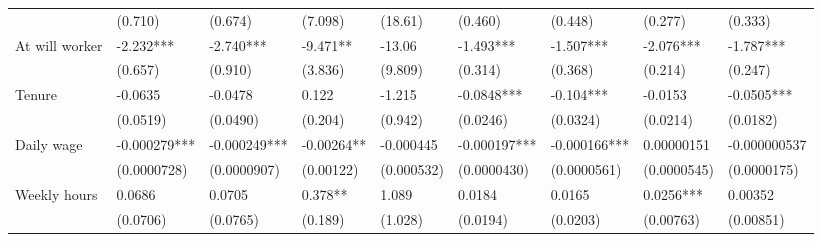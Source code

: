 \begin{tabular}{lrrrrrrrr}
      & \multicolumn{1}{l}{(0.710)} & \multicolumn{1}{l}{(0.674)} & \multicolumn{1}{l}{(7.098)} & \multicolumn{1}{l}{(18.61)} & \multicolumn{1}{l}{(0.460)} & \multicolumn{1}{l}{(0.448)} & \multicolumn{1}{l}{(0.277)} & \multicolumn{1}{l}{(0.333)} \\
At will worker & \multicolumn{1}{l}{-2.232***} & \multicolumn{1}{l}{-2.740***} & \multicolumn{1}{l}{-9.471**} & \multicolumn{1}{l}{-13.06} & \multicolumn{1}{l}{-1.493***} & \multicolumn{1}{l}{-1.507***} & \multicolumn{1}{l}{-2.076***} & \multicolumn{1}{l}{-1.787***} \\
      & \multicolumn{1}{l}{(0.657)} & \multicolumn{1}{l}{(0.910)} & \multicolumn{1}{l}{(3.836)} & \multicolumn{1}{l}{(9.809)} & \multicolumn{1}{l}{(0.314)} & \multicolumn{1}{l}{(0.368)} & \multicolumn{1}{l}{(0.214)} & \multicolumn{1}{l}{(0.247)} \\
Tenure & \multicolumn{1}{l}{-0.0635} & \multicolumn{1}{l}{-0.0478} & \multicolumn{1}{l}{0.122} & \multicolumn{1}{l}{-1.215} & \multicolumn{1}{l}{-0.0848***} & \multicolumn{1}{l}{-0.104***} & \multicolumn{1}{l}{-0.0153} & \multicolumn{1}{l}{-0.0505***} \\
      & \multicolumn{1}{l}{(0.0519)} & \multicolumn{1}{l}{(0.0490)} & \multicolumn{1}{l}{(0.204)} & \multicolumn{1}{l}{(0.942)} & \multicolumn{1}{l}{(0.0246)} & \multicolumn{1}{l}{(0.0324)} & \multicolumn{1}{l}{(0.0214)} & \multicolumn{1}{l}{(0.0182)} \\
Daily wage & \multicolumn{1}{l}{-0.000279***} & \multicolumn{1}{l}{-0.000249***} & \multicolumn{1}{l}{-0.00264**} & \multicolumn{1}{l}{-0.000445} & \multicolumn{1}{l}{-0.000197***} & \multicolumn{1}{l}{-0.000166***} & \multicolumn{1}{l}{0.00000151} & \multicolumn{1}{l}{-0.000000537} \\
      & \multicolumn{1}{l}{(0.0000728)} & \multicolumn{1}{l}{(0.0000907)} & \multicolumn{1}{l}{(0.00122)} & \multicolumn{1}{l}{(0.000532)} & \multicolumn{1}{l}{(0.0000430)} & \multicolumn{1}{l}{(0.0000561)} & \multicolumn{1}{l}{(0.0000545)} & \multicolumn{1}{l}{(0.0000175)} \\
Weekly hours & \multicolumn{1}{l}{0.0686} & \multicolumn{1}{l}{0.0705} & \multicolumn{1}{l}{0.378**} & \multicolumn{1}{l}{1.089} & \multicolumn{1}{l}{0.0184} & \multicolumn{1}{l}{0.0165} & \multicolumn{1}{l}{0.0256***} & \multicolumn{1}{l}{0.00352} \\
      & \multicolumn{1}{l}{(0.0706)} & \multicolumn{1}{l}{(0.0765)} & \multicolumn{1}{l}{(0.189)} & \multicolumn{1}{l}{(1.028)} & \multicolumn{1}{l}{(0.0194)} & \multicolumn{1}{l}{(0.0203)} & \multicolumn{1}{l}{(0.00763)} & \multicolumn{1}{l}{(0.00851)} \\

\end{tabular}
